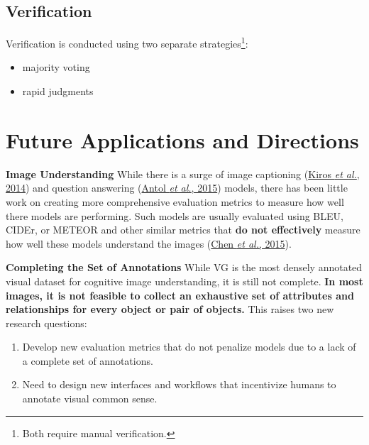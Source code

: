 \documentclass[10pt]{article}
\begin{document}
\setcounter{subsection}{6}
\subsection{Verification}%
\label{sec:verification}
Verification is conducted using two separate strategies\footnote{Both require
manual verification.}:
%
\begin{itemize}
  \item majority voting
  \item rapid judgments
\end{itemize}

\setcounter{section}{6}
\section{Future Applications and Directions}%
\label{sec:future}
\textbf{Image Understanding} While there is a surge of image captioning
(\href{http://www.cs.toronto.edu/~rkiros/papers/mnlm2014.pdf}
{Kiros \textit{et al.}, 2014}) and question answering
(\href{https://visualqa.org/}{Antol \textit{et al.}, 2015}) models, there has
been little work on creating more comprehensive evaluation metrics to measure
how well there models are performing. Such models are usually evaluated using
BLEU, CIDEr, or METEOR and other similar metrics that \textbf{do not
effectively} measure how well these models understand the images
(\href{https://arxiv.org/pdf/1504.00325.pdf}{Chen \textit{et al.}, 2015}).

\textbf{Completing the Set of Annotations} While VG is the most densely
annotated visual dataset for cognitive image understanding, it is still not
complete. \textbf{In most images, it is not feasible to collect an exhaustive
set of attributes and relationships for every object or pair of objects.} This
raises two new research questions:
%
\begin{enumerate}
  \item Develop new evaluation metrics that do not penalize models due to a
    lack of a complete set of annotations.
  \item Need to design new interfaces and workflows that incentivize humans to
    annotate visual common sense.
\end{enumerate}
\end{document}
